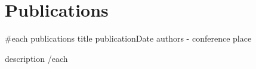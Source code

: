 \section{Publications}
\vspace{0pt}
\resumeSubHeadingListStart

{{#each publications}}
\resumeSubheading
  { {{title}} }{ {{publicationDate}} }
  { {{authors}} - {{conference}} }{ {{place}} }
  \resumeItemListStart
    \item {{description}}
  \resumeItemListEnd
{{/each}}

\resumeSubHeadingListEnd
\vspace{-4mm}
